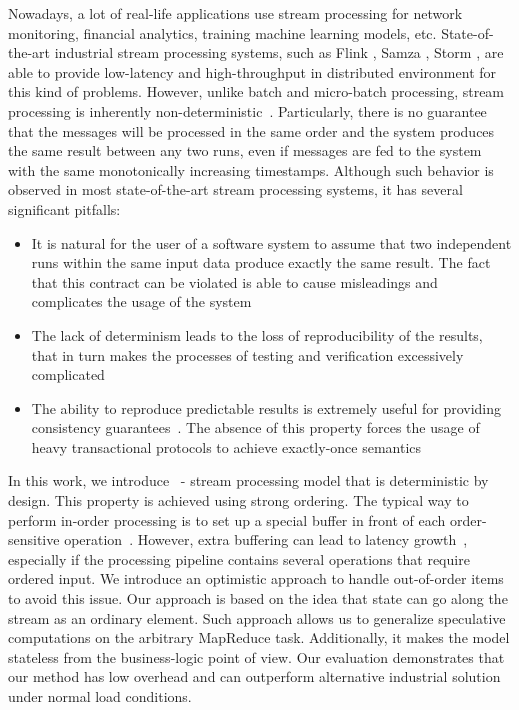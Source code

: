 
\label {fs-intro-seciton}

Nowadays, a lot of real-life applications use stream processing for network monitoring, financial analytics, training machine learning models, etc. State-of-the-art industrial stream processing systems, such as Flink \cite{carbone2015apache}, Samza \cite{Noghabi:2017:SSS:3137765.3137770}, Storm \cite{apache:storm}, are able to provide low-latency and high-throughput in distributed environment for this kind of problems. However, unlike batch and micro-batch processing, stream processing is inherently non-deterministic~\cite{Zaharia:2012:DSE:2342763.2342773}. Particularly, there is no guarantee that the messages will be processed in the same order and the system produces the same result between any two runs, even if messages are fed to the system with the same monotonically increasing timestamps. Although such behavior is observed in most state-of-the-art stream processing systems, it has several significant pitfalls:

\begin{itemize}
    \item It is natural for the user of a software system to assume that two independent runs within the same input data produce exactly the same result. The fact that this contract can be violated is able to cause misleadings and complicates the usage of the system
    \item The lack of determinism leads to the loss of reproducibility of the results, that in turn makes the processes of testing and verification excessively complicated~\cite{Zacheilas:2017:MDS:3093742.3093921}
    \item The ability to reproduce predictable results is extremely useful for providing consistency guarantees~\cite{Stonebraker:2005:RRS:1107499.1107504}. The absence of this property forces the usage of heavy transactional protocols to achieve exactly-once semantics~\cite{Carbone:2017:SMA:3137765.3137777, jacques2016consistent}
\end{itemize}

In this work, we introduce \FlameStream\ - stream processing model that is deterministic by design. This property is achieved using strong ordering. The typical way to perform in-order processing is to set up a special buffer in front of each order-sensitive operation~\cite{Li:2008:OPN:1453856.1453890}. However, extra buffering can lead to latency growth~\cite{Zacheilas:2017:MDS:3093742.3093921}, especially if the processing pipeline contains several operations that require ordered input. We introduce an optimistic approach to handle out-of-order items to avoid this issue. Our approach is based on the idea that state can go along the stream as an ordinary element. Such approach allows us to generalize speculative computations on the arbitrary MapReduce task. Additionally, it makes the model stateless from the business-logic point of view. Our evaluation demonstrates that our method has low overhead and can outperform alternative industrial solution under normal load conditions.

